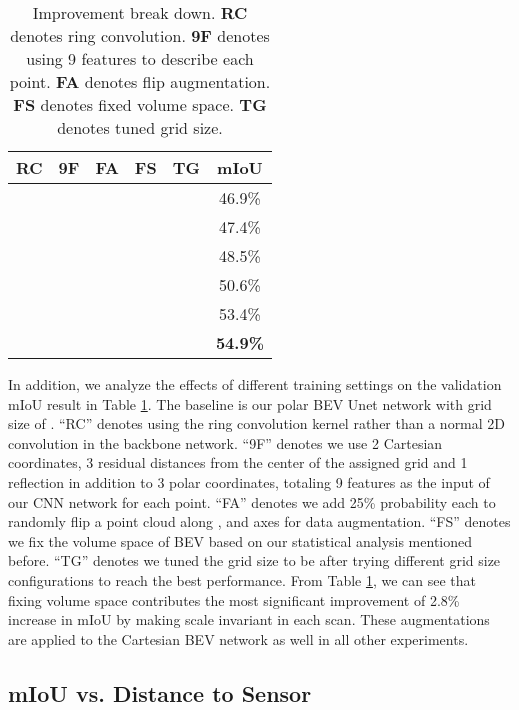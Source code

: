 \documentclass[10pt,twocolumn,letterpaper]{article}
\begin{document}
\begin{table}
\centering
\caption{Improvement break down. \textbf{RC} denotes ring convolution. \textbf{9F} denotes using 9 features to describe each point. \textbf{FA} denotes flip augmentation. \textbf{FS} denotes fixed volume space. \textbf{TG} denotes tuned grid size.}
\label{tab:ablation_study}
\begin{tabular}{ccccc|c}
\hline
\textbf{RC} & \textbf{9F} & \textbf{FA} & \textbf{FS} & \textbf{TG} & mIoU            \\

\hline
   &    &    &    &    &  46.9\%          \\
  &    &    &    &    &  47.4\%          \\
  &   &    &    &    &  48.5\%          \\
 &   &   &    &    &  50.6\%          \\
  &  &   &   &    &  53.4\%          \\
 &   &   &   &   &  \textbf{54.9\%} \\
\hline
\end{tabular}

\vspace{-4pt}
\end{table}

In addition, we analyze the effects of different training settings on the validation mIoU result in Table \ref{tab:ablation_study}. The baseline is our polar BEV Unet network with grid size of . ``RC'' denotes using the ring convolution kernel rather than a normal 2D convolution in the backbone network. ``9F'' denotes we use 2 Cartesian coordinates, 3 residual distances from the center of the assigned grid and 1 reflection in addition to 3 polar coordinates, totaling 9 features as the input of our CNN network for each point. ``FA'' denotes we add 25\% probability each to randomly flip a point cloud along ,  and  axes for data augmentation. ``FS'' denotes we fix the volume space of BEV based on our statistical analysis mentioned before. ``TG'' denotes we tuned the grid size to be  after trying different grid size configurations to reach the best performance. From Table \ref{tab:ablation_study}, we can see that fixing volume space contributes the most significant improvement of 2.8\% increase in mIoU by making scale invariant in each scan. These augmentations are applied to the Cartesian BEV network as well in all other experiments.



\subsection{mIoU vs. Distance to Sensor}
\end{document}
